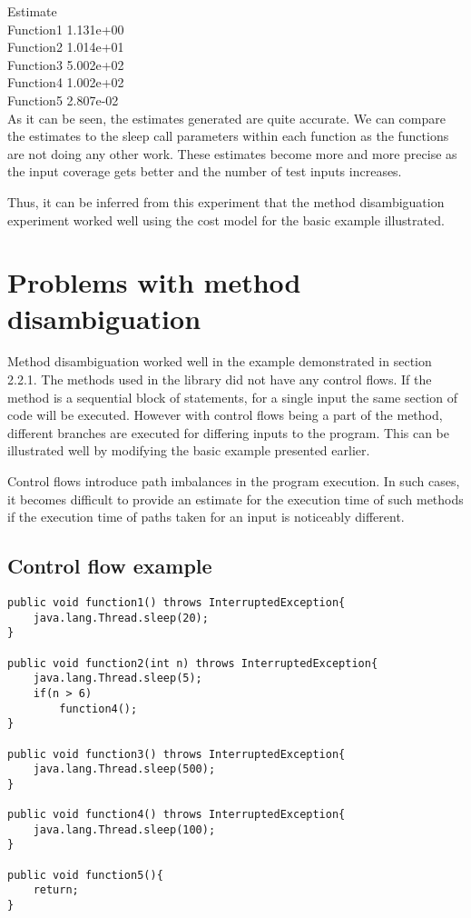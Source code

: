 \hspace{7em}Estimate   \\
Function1\hspace{2em} 1.131e+00  \\
Function2\hspace{2em} 1.014e+01  \\
Function3\hspace{2em} 5.002e+02  \\
Function4\hspace{2em} 1.002e+02  \\
Function5\hspace{2em} 2.807e-02  \\

As it can be seen, the estimates generated are quite accurate. We can compare the estimates to the sleep call parameters within each function as the functions are not doing any other work. These estimates become more and more precise as the input coverage gets better and the number of test inputs increases. \newline

Thus, it can be inferred from this experiment that the method disambiguation experiment worked well using the cost model for the basic example illustrated. 

\section{Problems with method disambiguation}
Method disambiguation worked well in the example demonstrated in section 2.2.1. The methods used in the library did not have any control flows. If the method is a sequential block of statements, for a single input the same section of code will be executed. However with control flows being a part of the method, different branches are executed for differing inputs to the program. This can be illustrated well by modifying the basic example presented earlier.\newline

Control flows introduce path imbalances in the program execution. In such cases, it becomes difficult to provide an estimate for the execution time of such methods if the  execution time of paths taken for an input is noticeably different.

\subsection{Control flow example}
\singlespacing
\begin{lstlisting}
public void function1() throws InterruptedException{
	java.lang.Thread.sleep(20);
}
	
public void function2(int n) throws InterruptedException{
	java.lang.Thread.sleep(5);
	if(n > 6)
		function4();	
}
	
public void function3() throws InterruptedException{
	java.lang.Thread.sleep(500);
}
	
public void function4() throws InterruptedException{	
	java.lang.Thread.sleep(100);
}
	
public void function5(){
	return;
}
\end{lstlisting}
\doublespacing

